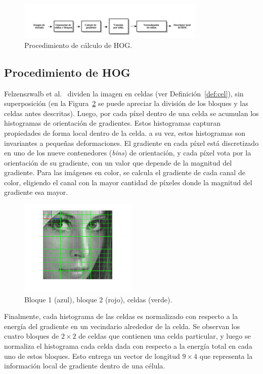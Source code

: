 \begin{figure}[tb]
  \centering
   \includegraphics[width=0.8\textwidth]{Figuras/hog-procedure.png}
   \caption[Procedimiento de cálculo de HOG]{Procedimiento de cálculo de HOG.}
   \label{fig:hog_procedure}
\end{figure}

\subsection{Procedimiento de HOG}
Felzenszwalb et al.~\cite{Felzenszwalb2010} dividen la imagen en celdas (ver Definición~\ref{def:cel}), sin superposición (en la Figura~\ref{fig:blocks_cells} se puede apreciar la división de los bloques y las celdas antes descritas). Luego, por cada píxel dentro de una celda se acumulan los histogramas de orientación de gradientes. Estos histogramas capturan propiedades de forma local dentro de la celda. a su vez, estos histogramas son invariantes a pequeñas deformaciones.
El gradiente en cada píxel está discretizado en uno de los nueve contenedores (\textit{bins}) de orientación, y cada píxel vota por la orientación de su gradiente, con un valor que depende de la magnitud del gradiente. Para las imágenes en color, se calcula el gradiente de cada canal de color, eligiendo el canal con la mayor cantidad de píxeles donde la magnitud del gradiente esa mayor. 

\begin{figure}[tb]
  \centering
   \includegraphics[width=0.5\textwidth]{Figuras/lena-grid.png}
   \caption[Bloques y celdas]{Bloque 1 (azul), bloque 2 (rojo), celdas (verde).}
   \label{fig:blocks_cells}
\end{figure}

Finalmente, cada histograma de las celdas es normalizado con respecto a la energía del gradiente en un vecindario alrededor de la celda. Se observan los cuatro bloques de $2 \times 2$ de celdas que contienen una celda particular, y luego se normaliza el histograma cada celda dada con respecto a la energía total en cada uno de estos bloques. Esto entrega un vector de longitud $9 \times 4$ que representa la información local de gradiente dentro de una célula.

